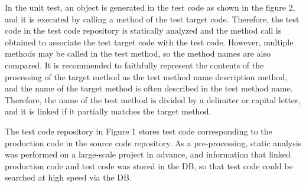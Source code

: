 \documentclass[conference]{IEEEtran}
\begin{document}
In the unit test, an object is generated in the test code as shown in the figure 2, and it is executed by calling a method of the test target code. Therefore, the test code in the test code repository is statically analyzed and the method call is obtained to associate the test target code with the test code. However, multiple methods may be called in the test method, so the method names are also compared. It is recommended to faithfully represent the contents of the processing of the target method as the test method name description method, and the name of the target method is often described in the test method name. Therefore, the name of the test method is divided by a delimiter or capital letter, and it is linked if it partially matches the target method.

The test code repository in Figure 1 stores test code corresponding to the production code in the source code repository. As a pre-processing, static analysis was performed on a large-scale project in advance, and information that linked production code and test code was stored in the DB, so that test code could be searched at high speed via the DB.
\end{document}
